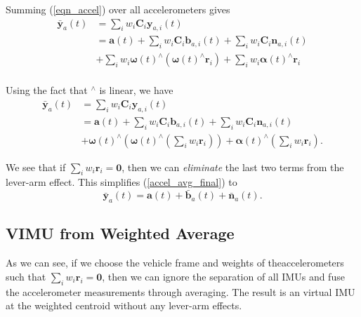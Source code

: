 \documentclass[conference]{IEEEtran}
\begin{document}
\noindent Summing (\ref{eqn_accel}) over all accelerometers gives
\begin{equation}
\begin{split}
    \bar{\textbf{y}}_a(t) &= \sum_i{w_i \textbf{C}_{i} \textbf{y}_{a,i}(t)} \\
    &= \textbf{a}(t) + \sum_i{w_i \textbf{C}_{i} \textbf{b}_{a,i}(t)} + \sum_i{w_i \textbf{C}_{i} \textbf{n}_{a,i}(t)} \\
    &+ \sum_i{w_i \bm{\omega}(t)^\wedge (\bm{\omega}(t)^\wedge \textbf{r}_i)} + \sum_i{w_i \bm{\alpha}(t)^\wedge \textbf{r}_i} \\
\end{split}
\end{equation}

\noindent Using the fact that $^\wedge$ is linear, we have
\begin{equation}\label{accel_avg_final}
\begin{split}
    \bar{\textbf{y}}_a(t) &= \sum_i{w_i \textbf{C}_{i} \textbf{y}_{a,i}(t)} \\
    &= \textbf{a}(t) + \sum_i{w_i \textbf{C}_{i} \textbf{b}_{a,i}(t)} + \sum_i{w_i \textbf{C}_{i} \textbf{n}_{a,i}(t)} \\
    &+ \bm{\omega}(t)^\wedge \left(\bm{\omega}(t)^\wedge \left( \sum_i{w_i \textbf{r}_i} \right) \right) + \bm{\alpha}(t)^\wedge \left( \sum_i{w_i\textbf{r}_i} \right).
\end{split}
\end{equation}

\noindent We see that if $\sum_i{w_i \textbf{r}_i} = \textbf{0}$, then we can {\em eliminate} the last two terms from the lever-arm effect. This simplifies (\ref{accel_avg_final}) to
\begin{equation}
    \bar{\textbf{y}}_a(t) = \textbf{a}(t) + \bar{\textbf{b}}_a(t) + \bar{\textbf{n}}_a(t).
\end{equation}

\subsection{VIMU from Weighted Average}\label{AA}

As we can see, if we choose the vehicle frame and weights of theaccelerometers such that $\sum_i{w_i \textbf{r}_i} = \textbf{0}$, then we can ignore the separation of all IMUs and fuse the accelerometer measurements through averaging. The result is an virtual IMU at the weighted centroid without any lever-arm effects.
\end{document}
